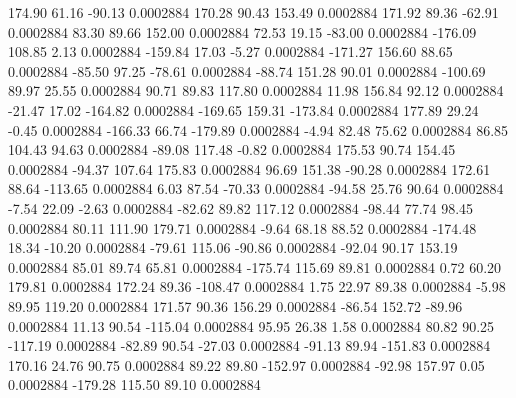       174.90       61.16      -90.13     0.0002884
      170.28       90.43      153.49     0.0002884
      171.92       89.36      -62.91     0.0002884
       83.30       89.66      152.00     0.0002884
       72.53       19.15      -83.00     0.0002884
     -176.09      108.85        2.13     0.0002884
     -159.84       17.03       -5.27     0.0002884
     -171.27      156.60       88.65     0.0002884
      -85.50       97.25      -78.61     0.0002884
      -88.74      151.28       90.01     0.0002884
     -100.69       89.97       25.55     0.0002884
       90.71       89.83      117.80     0.0002884
       11.98      156.84       92.12     0.0002884
      -21.47       17.02     -164.82     0.0002884
     -169.65      159.31     -173.84     0.0002884
      177.89       29.24       -0.45     0.0002884
     -166.33       66.74     -179.89     0.0002884
       -4.94       82.48       75.62     0.0002884
       86.85      104.43       94.63     0.0002884
      -89.08      117.48       -0.82     0.0002884
      175.53       90.74      154.45     0.0002884
      -94.37      107.64      175.83     0.0002884
       96.69      151.38      -90.28     0.0002884
      172.61       88.64     -113.65     0.0002884
        6.03       87.54      -70.33     0.0002884
      -94.58       25.76       90.64     0.0002884
       -7.54       22.09       -2.63     0.0002884
      -82.62       89.82      117.12     0.0002884
      -98.44       77.74       98.45     0.0002884
       80.11      111.90      179.71     0.0002884
       -9.64       68.18       88.52     0.0002884
     -174.48       18.34      -10.20     0.0002884
      -79.61      115.06      -90.86     0.0002884
      -92.04       90.17      153.19     0.0002884
       85.01       89.74       65.81     0.0002884
     -175.74      115.69       89.81     0.0002884
        0.72       60.20      179.81     0.0002884
      172.24       89.36     -108.47     0.0002884
        1.75       22.97       89.38     0.0002884
       -5.98       89.95      119.20     0.0002884
      171.57       90.36      156.29     0.0002884
      -86.54      152.72      -89.96     0.0002884
       11.13       90.54     -115.04     0.0002884
       95.95       26.38        1.58     0.0002884
       80.82       90.25     -117.19     0.0002884
      -82.89       90.54      -27.03     0.0002884
      -91.13       89.94     -151.83     0.0002884
      170.16       24.76       90.75     0.0002884
       89.22       89.80     -152.97     0.0002884
      -92.98      157.97        0.05     0.0002884
     -179.28      115.50       89.10     0.0002884
